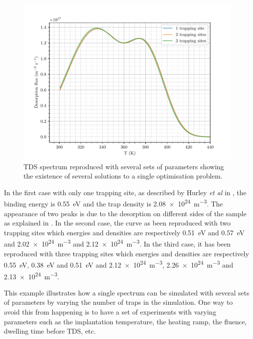 \begin{figure}[h!]
    \centering
    \includegraphics[width=0.9\linewidth]{Figures/Chapter3/Parametric_optimisation/hurley_comparison.pdf}
    \caption{TDS spectrum reproduced with several sets of parameters showing the existence of several solutions to a single optimisation problem.}
    \label{fig:hurley_comparison}
\end{figure}

In the first case with only one trapping site, as described by Hurley \textit{et al} in , the binding energy is \SI{0.55}{eV} and the trap density is \SI{2.08e24}{m^{-3}}.
The appearance of two peaks is due to the desorption on different sides of the sample as explained in \cite{hurley_numerical_2015}.
In the second case, the curve as been reproduced with two trapping sites which energies and densities are respectively \SI{0.51}{eV} and \SI{0.57}{eV} and \SI{2.02e24}{m^{-3}} and \SI{2.12e24}{m^{-3}}.
In the third case, it has been reproduced with three trapping sites which energies and densities are respectively \SI{0.55}{eV}, \SI{0.38}{eV} and \SI{0.51}{eV} and \SI{2.12e24}{m^{-3}}, \SI{2.26e24}{m^{-3}} and \newline \SI{2.13e24}{m^{-3}}.

This example illustrates how a single spectrum can be simulated with several sets of parameters by varying the number of traps in the simulation.
One way to avoid this from happening is to have a set of experiments with varying parameters such as the implantation temperature, the heating ramp, the fluence, dwelling time before TDS, etc.

